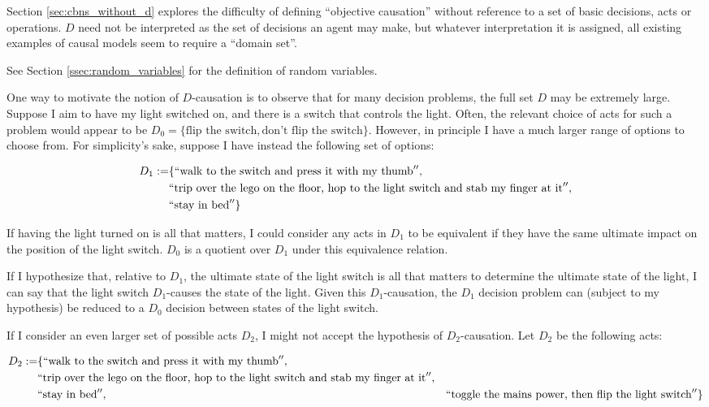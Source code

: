 Section \ref{sec:cbns_without_d} explores the difficulty of defining ``objective causation'' without reference to a set of basic decisions, acts or operations. $D$ need not be interpreted as the set of decisions an agent may make, but whatever interpretation it is assigned, all existing examples of causal models seem to require a ``domain set''.

See Section \ref{ssec:random_variables} for the definition of random variables.


One way to motivate the notion of $D$-causation is to observe that for many decision problems, the full set $D$ may be extremely large. Suppose I aim to have my light switched on, and there is a switch that controls the light. Often, the relevant choice of acts for such a problem would appear to be $D_0=\{\text{flip the switch},\text{don't flip the switch}\}$. However, in principle I have a much larger range of options to choose from. For simplicity's sake, suppose I have instead the following set of options:

\begin{align*}
D_1:=&\{``\text{walk to the switch and press it with my thumb}'', \\
    &``\text{trip over the lego on the floor, hop to the light switch and stab my finger at it}'',\\
    &``\text{stay in bed}''\}
\end{align*}

If having the light turned on is all that matters, I could consider any acts in $D_1$ to be equivalent if they have the same ultimate impact on the position of the light switch. $D_0$ is a quotient over $D_1$ under this equivalence relation. 

If I hypothesize that, relative to $D_1$, the ultimate state of the light switch is all that matters to determine the ultimate state of the light, I can say that the light switch $D_1$-causes the state of the light. Given this $D_1$-causation, the $D_1$ decision problem can (subject to my hypothesis) be reduced to a $D_0$ decision between states of the light switch.

If I consider an even larger set of possible acts $D_2$, I might not accept the hypothesis of $D_2$-causation. Let $D_2$ be the following acts:

\begin{align*}
D_2:=&\{``\text{walk to the switch and press it with my thumb}'', \\
    &``\text{trip over the lego on the floor, hop to the light switch and stab my finger at it}'',\\
    &``\text{stay in bed}'',
    &``\text{toggle the mains power, then flip the light switch}''\}
\end{align*}

